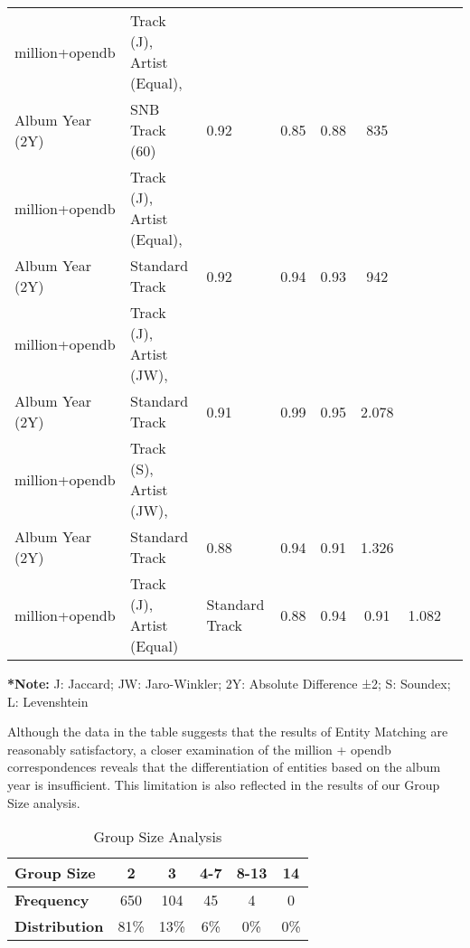\documentclass[runningheads]{llncs}
\begin{document}
\begin{table}[]
\begin{threeparttable}
\begin{tabular}{lp{4.5cm}p{2cm}ccccc}
		million+opendb       & \raggedright Track (J), Artist (Equal), \\ Album Year (2Y)           & \raggedright SNB Track (60)              & 0.92             & 0.85         & 0.88       & 835              \\
		\rowcolor[HTML]{FFFFCC} 
		million+opendb       & \raggedright Track (J), Artist (Equal), \\ Album Year (2Y)           & \raggedright Standard Track                            & 0.92             & 0.94         & 0.93      & 942              \\
		million+opendb       & \raggedright Track (J), Artist (JW), \\ Album Year (2Y)     & \raggedright Standard Track                            & 0.91             & 0.99         & 0.95       & 2.078            \\ 
		million+opendb       & \raggedright Track (S), Artist (JW), \\ Album Year (2Y)     & \raggedright Standard Track                            & 0.88             & 0.94         & 0.91       & 1.326            \\
		million+opendb       & \raggedright Track (J), Artist (Equal)                                & \raggedright Standard Track                            & 0.88             & 0.94         & 0.91      & 1.082            \\ \hline\hline
	\end{tabular}
	\begin{tablenotes}
		\footnotesize
		\item \textbf{*Note:} J: Jaccard; JW: Jaro-Winkler; 2Y: Absolute Difference ±2; S: Soundex; L: Levenshtein
		\end{tablenotes}
	\end{threeparttable}
\end{table}

Although the data in the table suggests that the results of Entity Matching are reasonably satisfactory, a closer examination of the million + opendb correspondences reveals that the differentiation of entities based on the album year is insufficient. This limitation is also reflected in the results of our Group Size analysis.
\setlength{\tabcolsep}{4pt} %
\begin{table}[ht]
	\centering
	\caption{Group Size Analysis}
	\label{tab:group_size}
	\begin{tabular}{lccccc}
	\hline
	\rowcolor[HTML]{D9D9D9} 
	\textbf{Group Size} & \textbf{2} & \textbf{3} & \textbf{4-7} & \textbf{8-13} & \textbf{14} \\ \hline
	\textbf{Frequency}  & 650        & 104        & 45           & 4            & 0           \\ \hline
	\textbf{Distribution} & 81\%       & 13\%       & 6\%          & 0\%           & 0\%         \\ \hline
	\end{tabular}
	\end{table}
	
\end{document}
